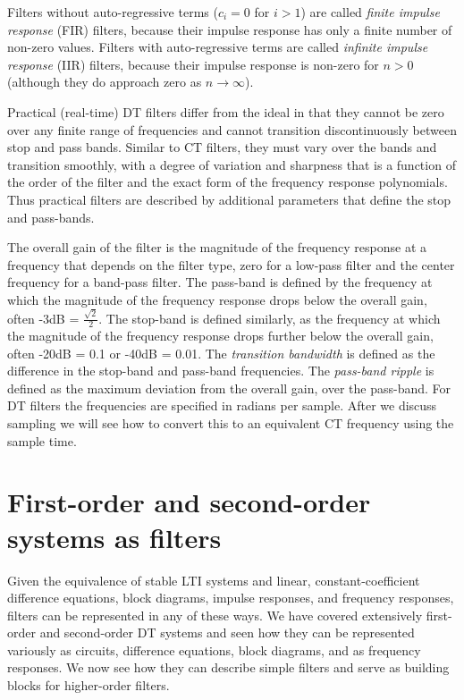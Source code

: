 Filters without auto-regressive terms ($c_i = 0$ for $i > 1$) are called \emph{finite impulse response} (FIR) filters, because their impulse response has only a finite number of non-zero values. Filters with auto-regressive terms are called \emph{infinite impulse response} (IIR) filters, because their impulse response is non-zero for $n > 0$ (although they do approach zero as $n\rightarrow \infty$). 

Practical (real-time) DT filters differ from the ideal in that they cannot be zero over any finite range of frequencies and cannot transition discontinuously between stop and pass bands. Similar to CT filters, they must vary over the bands and transition smoothly, with a degree of variation and sharpness that is a function of the order of the filter and the exact form of the frequency response polynomials. Thus practical filters are described by additional parameters that define the stop and pass-bands.

The overall gain of the filter is the magnitude of the frequency response at a frequency that depends on the filter type, zero for a low-pass filter and the center frequency for a band-pass filter. The pass-band is defined by the frequency at which the magnitude of the frequency response drops below the overall gain, often -3dB = $\frac{\sqrt{2}}{2}$. The stop-band is defined similarly, as the frequency at which the magnitude of the frequency response drops further below the overall gain, often -20dB = 0.1 or -40dB = 0.01. The \emph{transition bandwidth} is defined as the difference in the stop-band and pass-band frequencies. The \emph{pass-band ripple} is defined as the maximum deviation from the overall gain, over the pass-band. For DT filters the frequencies are specified in radians per sample. After we discuss sampling we will see how to convert this to an equivalent CT frequency using the sample time.

\section{First-order and second-order systems as filters}

Given the equivalence of stable LTI systems and linear, constant-coefficient difference equations, block diagrams, impulse responses, and frequency responses, filters can be represented in any of these ways. We have covered extensively first-order and second-order DT systems and seen how they can be represented variously as circuits, difference equations, block diagrams, and as frequency responses. We now see how they can describe simple filters and serve as building blocks for higher-order filters.

